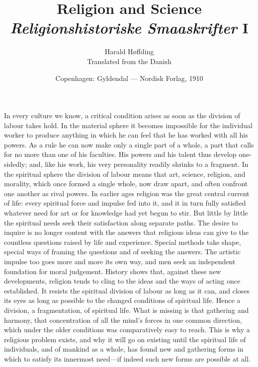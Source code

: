 \documentclass[12pt,a4paper]{article}
\title{\textbf{Religion and Science}\\[0.4em]
\large \emph{Religionshistoriske Smaaskrifter} I}
\author{Harald Høffding\\[4pt]
  \small Translated from the Danish}
\date{Copenhagen: Gyldendal --- Nordisk Forlag, 1910}
\newcommand{\opage}[1]{\marginnote{\footnotesize\textit{[#1]}}}
\begin{document}
\maketitle
\thispagestyle{fancy}

\bigskip

\noindent \opage{1}In every culture we know, a critical condition arises as soon as
the division of labour takes hold. In the material sphere it becomes
impossible for the individual worker to produce anything in which he can
feel that he has worked with all his powers. As a rule he can now make only
a single part of a whole, a part that calls for no more than one of his
faculties. His powers and his talent thus develop one-sidedly; and, like
his work, his very personality readily shrinks to a fragment. In the
spiritual sphere the division of labour means that art, science, religion,
and morality, which once formed a single whole, now draw apart, and often
confront one another as rival powers. In earlier ages religion was the
great central current of life: every spiritual force and impulse fed into
it, and it in turn fully satisfied whatever need for art or for knowledge
had yet begun to stir. But little by little the spiritual needs seek their
satisfaction along separate paths. The desire to inquire is no longer
content with the answers that religious ideas can give to the countless
questions raised by life and experience. Special methods take shape,
\opage{2}special ways of framing the questions and of seeking the answers. The
artistic impulse too goes more and more its own way, and men seek an
independent foundation for moral judgement. History shows that, against
these new developments, religion tends to cling to the ideas and the ways
of acting once established. It resists the spiritual division of labour as
long as it can, and closes its eyes as long as possible to the changed
conditions of spiritual life. Hence a division, a fragmentation, of
spiritual life. What is missing is that gathering and harmony, that
concentration of all the mind's forces in one common direction, which under
the older conditions was comparatively easy to reach. This is why a
religious problem exists, and why it will go on existing until the
spiritual life of individuals, and of mankind as a whole, has found new and
gathering forms in which to satisfy its innermost need---if indeed such new
forms are possible at all.
\end{document}

